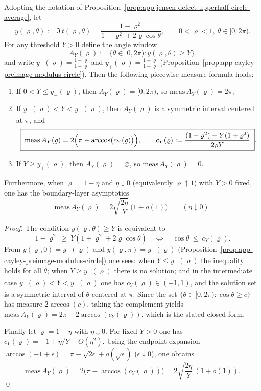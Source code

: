 \begin{proposition}\label{prop:app-jensen-endpoint-angle-window}
Adopting the notation of Proposition~\ref{prop:app-jensen-defect-upperhalf-circle-average}, let
\[
y(\varrho,\theta):=\Im\,t(\varrho,\theta)=\frac{1-\varrho^2}{1+\varrho^2+2\varrho\cos\theta},
\qquad 0<\varrho<1,\ \theta\in[0,2\pi).
\]
For any threshold \(Y>0\) define the angle window
\[
A_Y(\varrho):=\{\theta\in[0,2\pi): y(\varrho,\theta)\ge Y\}.
\]
and write
\(
y_{-}(\varrho)=\frac{1-\varrho}{1+\varrho}
\)
and
\(
y_{+}(\varrho)=\frac{1+\varrho}{1-\varrho}
\)
(Proposition~\ref{prop:app-cayley-preimage-modulus-circle}).
Then the following piecewise measure formula holds:
\begin{enumerate}
  \item If \(0<Y\le y_{-}(\varrho)\), then \(A_Y(\varrho)=[0,2\pi)\), so \(\mathrm{meas}\,A_Y(\varrho)=2\pi\);
  \item If \(y_{-}(\varrho)<Y<y_{+}(\varrho)\), then \(A_Y(\varrho)\) is a symmetric interval centered at \(\pi\), and
  \[
  \boxed{\;
  \mathrm{meas}\,A_Y(\varrho)=2\Bigl(\pi-\arccos\bigl(c_Y(\varrho)\bigr)\Bigr),\qquad
  c_Y(\varrho):=\frac{(1-\varrho^2)-Y(1+\varrho^2)}{2\varrho Y}\; }.
  \]
  \item If \(Y\ge y_{+}(\varrho)\), then \(A_Y(\varrho)=\varnothing\), so \(\mathrm{meas}\,A_Y(\varrho)=0\).
\end{enumerate}
Furthermore, when \(\varrho=1-\eta\) and \(\eta\downarrow 0\) (equivalently \(\varrho\uparrow 1\)) with \(Y>0\) fixed, one has the boundary-layer asymptotics
\[
\boxed{\;
\mathrm{meas}\,A_Y(\varrho)
=2\sqrt{\frac{2\eta}{Y}}\ \bigl(1+o(1)\bigr)\qquad(\eta\downarrow 0)\; }.
\]
\end{proposition}

\begin{proof}
The condition \(y(\varrho,\theta)\ge Y\) is equivalent to
\[
1-\varrho^2\ \ge\ Y(1+\varrho^2+2\varrho\cos\theta)
\quad\Longleftrightarrow\quad
\cos\theta\ \le\ c_Y(\varrho).
\]
From \(y(\varrho,0)=y_{-}(\varrho)\) and \(y(\varrho,\pi)=y_{+}(\varrho)\) (Proposition~\ref{prop:app-cayley-preimage-modulus-circle}) one sees:
when \(Y\le y_{-}(\varrho)\) the inequality holds for all \(\theta\); when \(Y\ge y_{+}(\varrho)\) there is no solution; and in the intermediate case \(y_{-}(\varrho)<Y<y_{+}(\varrho)\) one has \(c_Y(\varrho)\in(-1,1)\), and the solution set is a symmetric interval of \(\theta\) centered at \(\pi\).
Since the set \(\{\theta\in[0,2\pi):\cos\theta\ge c\}\) has measure \(2\arccos(c)\), taking the complement yields
\(\mathrm{meas}\,A_Y(\varrho)=2\pi-2\arccos(c_Y(\varrho))\), which is the stated closed form.
\par
Finally let \(\varrho=1-\eta\) with \(\eta\downarrow 0\). For fixed \(Y>0\) one has
\(
c_Y(\varrho)=-1+\eta/Y+O(\eta^2)
\).
Using the endpoint expansion \(\arccos(-1+\epsilon)=\pi-\sqrt{2\epsilon}+o(\sqrt{\epsilon})\) (\(\epsilon\downarrow 0\)), one obtains
\[
\mathrm{meas}\,A_Y(\varrho)
=2\bigl(\pi-\arccos(c_Y(\varrho))\bigr)
=2\sqrt{\frac{2\eta}{Y}}\,(1+o(1)).
\]
\qed
\end{proof}

